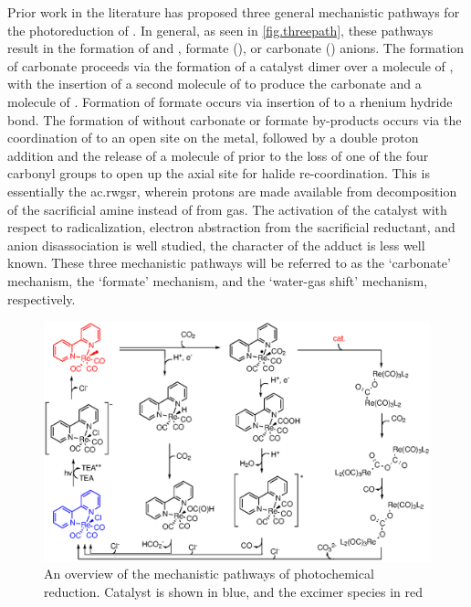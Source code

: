 Prior work in the literature has proposed three general mechanistic pathways for the photoreduction of . In general, as seen in \autoref{fig.threepath}, these pathways result in the formation of  and , formate (), or carbonate () anions. The formation of carbonate proceeds via the formation of a catalyst dimer over a molecule of , with the insertion of a second molecule of  to produce the carbonate and a molecule of . Formation of formate occurs via insertion of  to a rhenium hydride bond. The formation of  without carbonate or formate by-products occurs via the coordination of  to an open site on the metal, followed by a double proton addition and the release of a molecule of  prior to the loss of one of the four carbonyl groups to open up the axial site for halide re-coordination. This is essentially the \gls{ac.rwgsr}, wherein protons are made available from decomposition of the sacrificial amine instead of from  gas\autocite{kalyanasundaram1978}. The activation of the catalyst with respect to radicalization, electron abstraction from the sacrificial reductant, and anion disassociation is well studied, the character of the  adduct is less well known. These three mechanistic pathways will be referred to as the `carbonate' mechanism, the `formate' mechanism, and the `water-gas shift' mechanism, respectively.

\begin{figure}[!htb]
 \begin{center}
  \includegraphics[clip=true, width=\textwidth, keepaspectratio]{images/threepaths.eps}
 \end{center}
\caption[Overview of mechanistic pathways]{An overview of the mechanistic pathways of photochemical  reduction. Catalyst is shown in blue, and the excimer species in red}
\label{fig.threepath}
\end{figure} 

